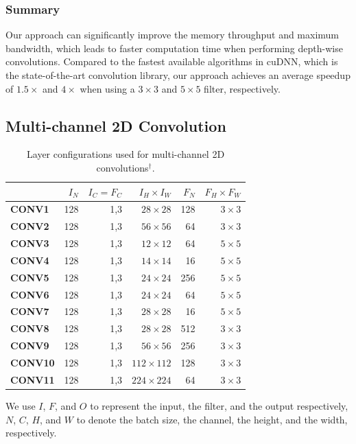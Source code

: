 \subsubsection{Summary}
Our approach can significantly improve the memory throughput and maximum bandwidth, which leads to faster computation time when performing
depth-wise convolutions.  Compared to the fastest available algorithms in cuDNN, which is the state-of-the-art convolution library, our
approach achieves an average speedup of $1.5\times$ and $4\times$ when using a $3 \times 3$ and $5 \times 5$ filter, respectively.


\subsection{Multi-channel 2D Convolution}
\label{multicconvexp}

\begin{table}[]
\caption{Layer configurations used for multi-channel 2D convolutions$^{\dag}$.}
\label{tab:3dconvconfigs}
\begin{threeparttable}
\begin{tabular}{lrrrrr}
\toprule
& \textbf{$I_N$} & \textbf{$I_C=F_C$} & \textbf{$I_H \times I_W$} & \textbf{$F_N$} & \textbf{$F_H \times F_W$} \\
\midrule
\textbf{CONV1} & 128  & 1,3       & $28\times 28$     & 128  & $3\times 3$       \\
\textbf{CONV2} & 128  & 1,3       & $56\times 56$     & 64   & $3\times 3$       \\
\textbf{CONV3} & 128  & 1,3       & $12\times 12$     & 64   & $5\times 5$       \\
\textbf{CONV4} & 128  & 1,3       & $14\times 14$     & 16   & $5 \times 5$       \\
\textbf{CONV5} & 128  & 1,3       & $24\times 24$    & 256  & $5 \times 5$       \\
\textbf{CONV6} & 128  & 1,3       & $24\times 24$     & 64   & $5\times 5$       \\
\textbf{CONV7} & 128  & 1,3       & $28\times 28$     & 16   & $5\times 5$       \\
\textbf{CONV8} & 128  & 1,3       & $28\times 28$     & 512   & $3\times 3$       \\
\textbf{CONV9} & 128  & 1,3       & $56\times 56$     & 256  & $3\times 3$       \\
\textbf{CONV10} & 128  & 1,3       & $112\times 112$     & 128   & $3\times 3$       \\
\textbf{CONV11} &128  & 1,3       & $224\times 224$     & 64   & $3\times 3$      \\
\bottomrule
\end{tabular}
\begin{tablenotes}
\item[\dag] We use $I$, $F$, and $O$ to represent the input, the filter, and the output respectively, $N$, $C$, $H$, and $W$
to denote the batch size, the channel, the height, and the width, respectively.
\end{tablenotes}
\end{threeparttable}
\end{table}

